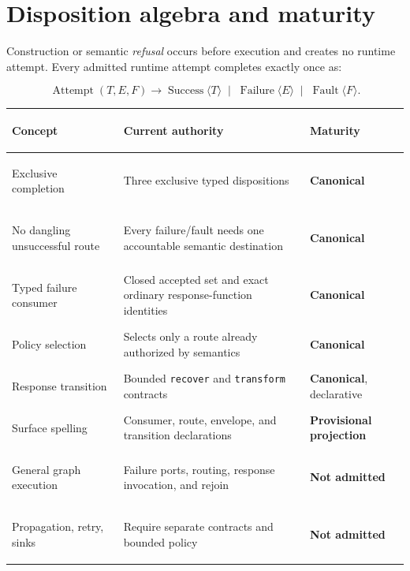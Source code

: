 \documentclass[11pt,a4paper]{article}
\newcommand{\canonical}{\textcolor{LyraGreen}{\textbf{Canonical}}\xspace}
\newcommand{\provisional}{\textcolor{LyraAmber}{\textbf{Provisional projection}}\xspace}
\newcommand{\notadmitted}{\textcolor{LyraRed}{\textbf{Not admitted}}\xspace}
\newcommand{\code}[1]{\texttt{#1}}
\begin{document}
\section{Disposition algebra and maturity}

Construction or semantic \emph{refusal} occurs before execution and creates no
runtime attempt. Every admitted runtime attempt completes exactly once as:

\[
  \operatorname{Attempt}(T,E,F)
  \longrightarrow
  \operatorname{Success}\langle T\rangle
  \;\mid\;
  \operatorname{Failure}\langle E\rangle
  \;\mid\;
  \operatorname{Fault}\langle F\rangle .
\]

\begin{center}
\end{center}

\small
\begin{tabularx}{0.96\linewidth}{>{\bfseries\raggedright\arraybackslash}p{29mm}
  >{\raggedright\arraybackslash}X
  >{\raggedright\arraybackslash}p{34mm}}
\toprule
Concept & Current authority & Maturity \\
\midrule
Exclusive completion & Three exclusive typed dispositions & \canonical \\
No dangling unsuccessful route & Every failure/fault needs one accountable semantic destination & \canonical \\
Typed failure consumer & Closed accepted set and exact ordinary response-function identities & \canonical \\
Policy selection & Selects only a route already authorized by semantics & \canonical \\
Response transition & Bounded \code{recover} and \code{transform} contracts & \canonical, declarative \\
Surface spelling & Consumer, route, envelope, and transition declarations & \provisional \\
General graph execution & Failure ports, routing, response invocation, and rejoin & \notadmitted \\
Propagation, retry, sinks & Require separate contracts and bounded policy & \notadmitted \\
\bottomrule
\end{tabularx}
\normalsize
\end{document}
